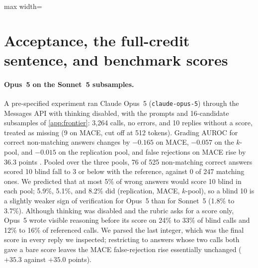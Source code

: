 \begin{table}[htbp]
\centering
\caption{Sources of the cells of \cref{tab:false-reject}: value (points, 95\% CI), pool, scorer or experiment, and number of tasks.}
\label{tab:fr-sources}
\footnotesize
\begin{adjustbox}{max width=\linewidth}\end{adjustbox}
\end{table}

\FloatBarrier
\section{Acceptance, the full-credit sentence, and benchmark scores}
\label{app:acceptance}

\paragraph{Opus~5 on the Sonnet~5 subsamples.}
A pre-specified experiment ran Claude Opus~5 (\texttt{claude-opus-5}) through the Messages API with thinking disabled, with the prompts and 16-candidate subsamples of \cref{app:frontier}: 3,264 calls, no errors, and 10 replies without a score, treated as missing (9 on \textsc{MACE}, cut off at 512 tokens). Grading AUROC for correct non-matching answers changes by $-0.165$  on \textsc{MACE}, $-0.057$  on the $k$-pool, and $-0.015$  on the replication pool, and false rejections on \textsc{MACE} rise by 36.3 points . Pooled over the three pools, 76 of 525 non-matching correct answers scored 10 blind fall to 3 or below with the reference, against 0 of 247 matching ones. We predicted that at most 5\% of wrong answers would score 10 blind in each pool; 5.9\%, 5.1\%, and 8.2\% did (replication, \textsc{MACE}, $k$-pool), so a blind 10 is a slightly weaker sign of verification for Opus~5 than for Sonnet~5 (1.8\% to 3.7\%). Although thinking was disabled and the rubric asks for a score only, Opus~5 wrote visible reasoning before its score on 24\% to 33\% of blind calls and 12\% to 16\% of referenced calls. We parsed the last integer, which was the final score in every reply we inspected; restricting to answers whose two calls both gave a bare score leaves the \textsc{MACE} false-rejection rise essentially unchanged ($+35.3$ against $+35.0$ points).\ph

